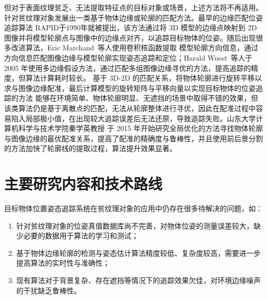 但对于表面纹理贫乏、无法提取特征点的目标对象或场景，上述方法将不再适用。
针对贫纹理对象发展出一类基于物体边缘或轮廓的匹配方法。最早的边缘匹配位姿追踪算法 RAPID\cite{HarrisRAPIDaVideoRate1990}于1990年就被提出，该方法通过将 3D 模型的边缘点映射到 2D 图像并将模型轮廓点与图像中的边缘点对齐，以追踪目标物体的位姿。随后出现很多改进算法，Eric Marchand~等人\cite{Marchand2D3DModelbased2001,ComportRealtimeTrackerMarkerless2003}使用卷积核函数提取
模型轮廓方向信息，通过方向信息匹配图像边缘与模型轮廓实现姿态追踪和定位；Harald Wuest~等人\cite{WuestAdaptiveLineTracking2005}于 2005 年使用多边缘假设方法，通过匹配多组图像边缘寻优的方法，提高追踪的精度，但算法计算耗时较长。
基于 3D-2D 的匹配关系，将物体轮廓进行旋转平移以求与图像边缘配准，最后计算模型的旋转矩阵与平移向量以实现目标物体的位姿追踪的方法
能够在环境简单、物体轮廓明显、无遮挡的场景中取得不错的效果，但该类算法仍是基于离散点的匹配，无法从轮廓整体进行寻优，因此在配准过程中容易陷入局部极小值，在出现较大追踪误差后无法还原，导致追踪失败。山东大学计算机科学与技术学院秦学英教授
于 2015 年开始研究全局优化的方法寻找物体轮廓与图像边缘的最优配准关系，提高了配准的精确度与鲁棒性，并且使用前后景分割的方法加快了轮廓线的提取过程，算法提升效果显著\cite{WangGlobalOptimalSearching2015,ChenHunHeXianShiZhongDeXuShiRongHeYuRenJiZhiNengJiaoRong2016,WangPoseOptimizationEdge2017}。

\section{主要研究内容和技术路线}
\label{sec:problem}
目标物体位置姿态追踪系统在贫纹理对象的应用中仍存在很多待解决的问题，如：
\begin{enumerate}[{(}1{)}]
\item 针对贫纹理对象的位姿真值数据库尚不完善，对物体位姿的测量误差较大，缺少必要的数据用于算法的学习和测试；
\item 基于物体边缘轮廓的检测与姿态估计算法精度较低、复杂度较高，需要进一步提高算法的实时性与准确性；
\item 现有算法对于背景复杂、存在遮挡等情况下的追踪效果欠佳，对环境边缘噪声的干扰缺乏鲁棒性。
\end{enumerate}


